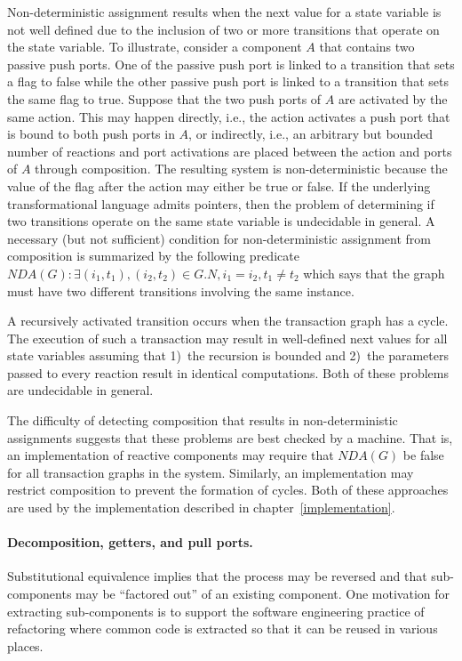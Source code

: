 Non-deterministic assignment results when the next value for a state variable is not well defined due to the inclusion of two or more transitions that operate on the state variable.
To illustrate, consider a component $A$ that contains two passive push ports.
One of the passive push port is linked to a transition that sets a flag to false while the other passive push port is linked to a transition that sets the same flag to true.
Suppose that the two push ports of $A$ are activated by the same action.
This may happen directly, i.e., the action activates a push port that is bound to both push ports in $A$, or indirectly, i.e., an arbitrary but bounded number of reactions and port activations are placed between the action and ports of $A$ through composition.
The resulting system is non-deterministic because the value of the flag after the action may either be true or false.
If the underlying transformational language admits pointers, then the problem of determining if two transitions operate on the same state variable is undecidable in general.
A necessary (but not sufficient) condition for non-deterministic assignment from composition is summarized by the following predicate $NDA(G): \exists (i_1, t_1), (i_2, t_2) \in G.N, i_1 = i_2, t_1 \ne t_2$ which says that the graph must have two different transitions involving the same instance.

A recursively activated transition occurs when the transaction graph has a cycle.
The execution of such a transaction may result in well-defined next values for all state variables assuming that 1)~the recursion is bounded and 2)~the parameters passed to every reaction result in identical computations.
Both of these problems are undecidable in general.

The difficulty of detecting composition that results in non-deterministic assignments suggests that these problems are best checked by a machine.
That is, an implementation of reactive components may require that $NDA(G)$ be false for all transaction graphs in the system.
Similarly, an implementation may restrict composition to prevent the formation of cycles.
Both of these approaches are used by the implementation described in chapter~\ref{implementation}.

\paragraph{Decomposition, getters, and pull ports.}
Substitutional equivalence implies that the process may be reversed and that sub-components may be ``factored out'' of an existing component.
One motivation for extracting sub-components is to support the software engineering practice of refactoring where common code is extracted so that it can be reused in various places.

